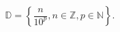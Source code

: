 \documentclass[preview]{standalone}
\begin{document}
\begin{align*}
\mathbb{D} = \left \{ \dfrac{n}{10^p},n\in\mathbb{Z},p\in\mathbb{N} \right \}.
\end{align*}
\end{document}
